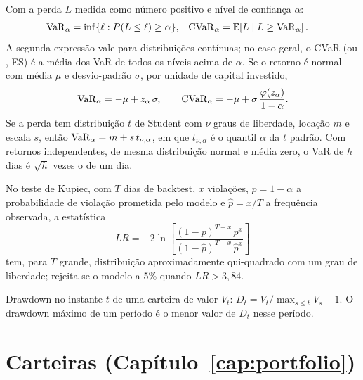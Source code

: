 Com a perda $L$ medida como número positivo e nível de confiança $\alpha$:
\begin{align*}
\operatorname{VaR}_\alpha &= \inf\{\ell : P(L \le \ell) \ge \alpha\} , &
\operatorname{CVaR}_\alpha &= \operatorname{\mathbb{E}}\!\left[L \mid L \ge \operatorname{VaR}_\alpha\right] .
\end{align*}
A segunda expressão vale para distribuições contínuas; no caso geral, o CVaR (ou , ES) é a média dos VaR de todos os níveis acima de $\alpha$. Se o retorno é normal com média $\mu$ e desvio-padrão $\sigma$, por unidade de capital investido,
\begin{equation*}
\operatorname{VaR}_\alpha = -\mu + z_\alpha\,\sigma , \qquad \operatorname{CVaR}_\alpha = -\mu + \sigma\,\frac{\varphi(z_\alpha)}{1-\alpha} .
\end{equation*}
Se a perda tem distribuição $t$ de Student com $\nu$ graus de liberdade, locação $m$ e escala $s$, então $\operatorname{VaR}_\alpha = m + s\,t_{\nu,\alpha}$, em que $t_{\nu,\alpha}$ é o quantil $\alpha$ da $t$ padrão. Com retornos independentes, de mesma distribuição normal e média zero, o VaR de $h$ dias é $\sqrt{h}$ vezes o de um dia.

No teste de Kupiec, com $T$ dias de backtest, $x$ violações, $p = 1-\alpha$ a probabilidade de violação prometida pelo modelo e $\hat p = x/T$ a frequência observada, a estatística
\begin{equation*}
LR = -2 \ln\!\left[\frac{(1-p)^{T-x}\, p^{x}}{(1-\hat{p})^{T-x}\, \hat{p}^{x}}\right]
\end{equation*}
tem, para $T$ grande, distribuição aproximadamente qui-quadrado com um grau de liberdade; rejeita-se o modelo a 5\% quando $LR > 3,84$.

Drawdown no instante $t$ de uma carteira de valor $V_t$: $D_t = V_t / \max_{s\le t} V_s - 1$. O drawdown máximo de um período é o menor valor de $D_t$ nesse período.

\section{Carteiras (Capítulo~\ref{cap:portfolio})}

